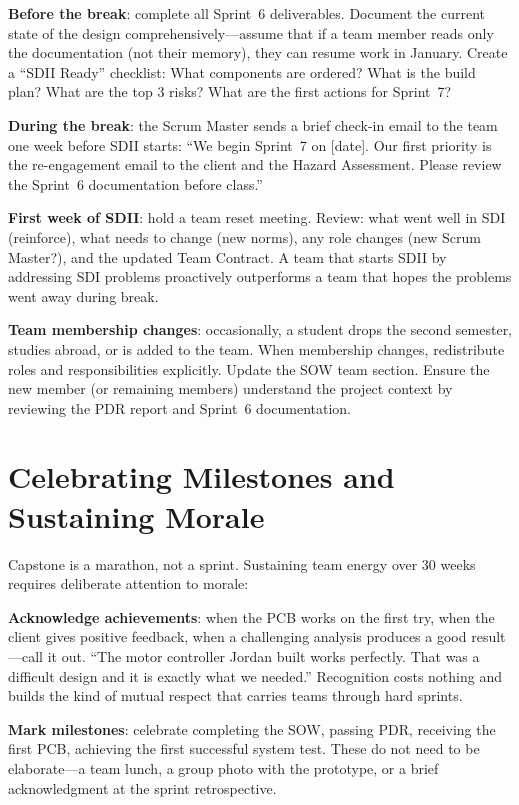 \textbf{Before the break}: complete all Sprint~6 deliverables. Document the current state of the design comprehensively---assume that if a team member reads only the documentation (not their memory), they can resume work in January. Create a ``SDII Ready'' checklist: What components are ordered? What is the build plan? What are the top 3 risks? What are the first actions for Sprint~7?

\textbf{During the break}: the Scrum Master sends a brief check-in email to the team one week before SDII starts: ``We begin Sprint~7 on [date]. Our first priority is the re-engagement email to the client and the Hazard Assessment. Please review the Sprint~6 documentation before class.''

\textbf{First week of SDII}: hold a team reset meeting. Review: what went well in SDI (reinforce), what needs to change (new norms), any role changes (new Scrum Master?), and the updated Team Contract. A team that starts SDII by addressing SDI problems proactively outperforms a team that hopes the problems went away during break.

\textbf{Team membership changes}: occasionally, a student drops the second semester, studies abroad, or is added to the team. When membership changes, redistribute roles and responsibilities explicitly. Update the SOW team section. Ensure the new member (or remaining members) understand the project context by reviewing the PDR report and Sprint~6 documentation.

\section{Celebrating Milestones and Sustaining Morale}
Capstone is a marathon, not a sprint. Sustaining team energy over 30 weeks requires deliberate attention to morale:

\textbf{Acknowledge achievements}: when the PCB works on the first try, when the client gives positive feedback, when a challenging analysis produces a good result---call it out. ``The motor controller Jordan built works perfectly. That was a difficult design and it is exactly what we needed.'' Recognition costs nothing and builds the kind of mutual respect that carries teams through hard sprints.

\textbf{Mark milestones}: celebrate completing the SOW, passing PDR, receiving the first PCB, achieving the first successful system test. These do not need to be elaborate---a team lunch, a group photo with the prototype, or a brief acknowledgment at the sprint retrospective.

